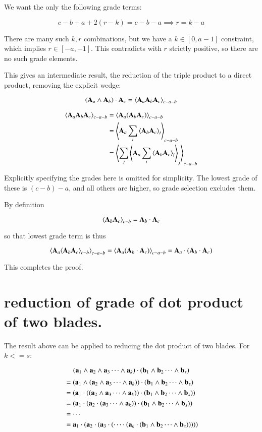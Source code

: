 \documentclass{article}      %
\newcommand{\gpgrade}[2] {{\left\langle{{#1}}\right\rangle}_{#2}}
\begin{document}
We want the only the following grade terms:

\[
c-b+a+2(r-k) = c - b - a
\implies
r=k-a
\]

There are many such $k,r$ combinations, but we have a $k \in [0,a-1]$ constraint, which implies $r \in [-a,-1]$.  This contradicts with $r$ strictly
positive,
so there are no such grade elements.

This gives an intermediate result, the reduction of the triple product to a direct product, removing the explicit wedge:

\begin{equation}
(\BA_a \wedge \BA_b) \cdot \BA_c =
\gpgrade{\BA_a \BA_b \BA_c}{c-a-b}
\end{equation}

\begin{align*}
\gpgrade{\BA_a \BA_b \BA_c}{c-a-b}
&= \gpgrade{\BA_a (\BA_b \BA_c)}{c-a-b} \\
&= \gpgrade{\BA_a \sum_{i}\gpgrade{\BA_b \BA_c}{i}}{c-a-b} \\
&= \gpgrade{\sum_{j}\gpgrade{\BA_a \sum_{i}\gpgrade{\BA_b \BA_c}{i}}{j}}{c-a-b} \\
\end{align*}

Explicitly specifying the grades here is omitted for simplicity.  The lowest grade of these is $(c-b)-a$, and all others are higher, 
so grade selection excludes them.

By definition

\[
\gpgrade{\BA_b \BA_c}{c-b} = \BA_b \cdot \BA_c
\]

so that lowest grade term is thus

\[
\gpgrade{\BA_a \gpgrade{\BA_b \BA_c}{c-b}}{c-a-b}
= \gpgrade{\BA_a (\BA_b \cdot \BA_c)}{c-a-b}
= \BA_a \cdot (\BA_b \cdot \BA_c)
\]

This completes the proof.

\section{ reduction of grade of dot product of two blades. }

The result above can be applied to reducing the dot product of two blades.  For $k<=s$:

\[
(\mathbf{a}_1 \wedge \mathbf{a}_2 \wedge \mathbf{a}_3 \cdots \wedge \mathbf{a}_k) \cdot (\mathbf{b}_1 \wedge \mathbf{b}_2 \cdots \wedge \mathbf{b}_s)
\]
\begin{align*}
&= (\mathbf{a}_1 \wedge (\mathbf{a}_2 \wedge \mathbf{a}_3 \cdots \wedge \mathbf{a}_k)) \cdot (\mathbf{b}_1 \wedge \mathbf{b}_2 \cdots \wedge \mathbf{b}_s) \\
&= (\mathbf{a}_1 \cdot ((\mathbf{a}_2 \wedge \mathbf{a}_3 \cdots \wedge \mathbf{a}_k)) \cdot (\mathbf{b}_1 \wedge \mathbf{b}_2 \cdots \wedge \mathbf{b}_s)) \\
&= (\mathbf{a}_1 \cdot (\mathbf{a}_2 \cdot (\mathbf{a}_3 \cdots \wedge \mathbf{a}_k)) \cdot (\mathbf{b}_1 \wedge \mathbf{b}_2 \cdots \wedge \mathbf{b}_s)) \\
&= \cdots \\
&= \mathbf{a}_1 \cdot (\mathbf{a}_2 \cdot (\mathbf{a}_3 \cdot (\cdots \cdot (\mathbf{a}_k \cdot (\mathbf{b}_1 \wedge \mathbf{b}_2 \cdots \wedge \mathbf{b}_s))))) \\
\end{align*}
\end{document}
